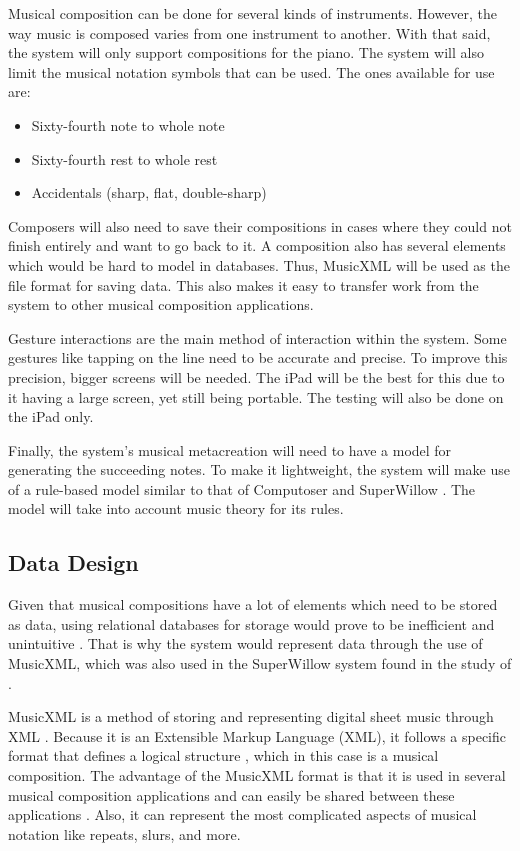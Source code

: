 Musical composition can be done for several kinds of instruments. However, the way music is composed varies from one instrument to another. With that said, the system will only support compositions for the piano. The system will also limit the musical notation symbols that can be used. The ones available for use are: 

\begin{itemize}
	\item Sixty-fourth note to whole note
    \item Sixty-fourth rest to whole rest
    \item Accidentals (sharp, flat, double-sharp)
\end{itemize}

Composers will also need to save their compositions in cases where they could not finish entirely and want to go back to it. A composition also has several elements which would be hard to model in databases. Thus, MusicXML will be used as the file format for saving data. This also makes it easy to transfer work from the system to other musical composition applications.

Gesture interactions are the main method of interaction within the system. Some gestures like tapping on the line need to be accurate and precise. To improve this precision, bigger screens will be needed. The iPad will be the best for this due to it having a large screen, yet still being portable. The testing will also be done on the iPad only.

Finally, the system's musical metacreation will need to have a model for generating the succeeding notes. To make it lightweight, the system will make use of a rule-based model similar to that of Computoser \citep{bozhanov2014computoser} and SuperWillow \citep{schulze2011music}. The model will take into account music theory for its rules.

\subsection{Data Design}

Given that musical compositions have a lot of elements which need to be stored as data, using relational databases for storage would prove to be inefficient and unintuitive \citep{hristidis2003efficient}. That is why the system would represent data through the use of MusicXML, which was also used in the SuperWillow system found in the study of \citeauthor{schulze2011music}.

MusicXML is a method of storing and representing digital sheet music through XML \citep{makemusic2017musicxml}. Because it is an Extensible Markup Language (XML), it follows a specific format that defines a logical structure \citep{bray1997extensible}, which in this case is a musical composition. The advantage of the MusicXML format is that it is used in several musical composition applications and can easily be shared between these applications \citep{makemusic2017musicxml}. Also, it can represent the most complicated aspects of musical notation like repeats, slurs, and more.

